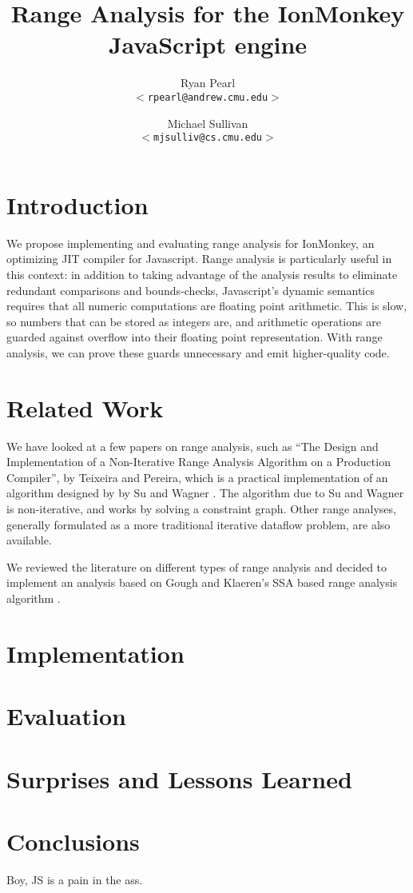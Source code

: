 \documentclass{article}
\begin{document}
\title{\bf Range Analysis for the IonMonkey JavaScript engine}

\author{
Ryan Pearl\\
\texttt{$<$rpearl@andrew.cmu.edu$>$}\\
\and
Michael Sullivan\\
\texttt{$<$mjsulliv@cs.cmu.edu$>$}\\
}

\maketitle

\section{Introduction}
We propose implementing and evaluating range analysis for IonMonkey,
an optimizing JIT compiler for Javascript. Range analysis is
particularly useful in this context: in addition to taking advantage
of the analysis results to eliminate redundant comparisons and
bounds-checks, Javascript's dynamic semantics requires that all
numeric computations are floating point arithmetic.  This is slow, so
numbers that can be stored as integers are, and arithmetic operations
are guarded against overflow into their floating point
representation. With range analysis, we can prove these guards
unnecessary and emit higher-quality code.


\section{Related Work}
We have looked at a few papers on range analysis, such as ``The Design
and Implementation of a Non-Iterative Range Analysis Algorithm on a
Production Compiler'', by Teixeira and Pereira, which is a practical
implementation of an algorithm designed by by Su and Wagner
\cite{Su04aclass}. The algorithm due to Su and Wagner is
non-iterative, and works by solving a constraint graph. Other range
analyses, generally formulated as a more traditional iterative
dataflow problem, are also available.

We reviewed the literature on different types of range analysis and
decided to implement an analysis based on Gough and Klaeren's SSA
based range analysis algorithm \cite{Gough94eliminatingrange}.

\section{Implementation}

\section{Evaluation}

\section{Surprises and Lessons Learned}

\section{Conclusions}
Boy, JS is a pain in the ass.

{}

\end{document}
